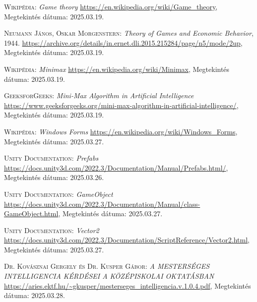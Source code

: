 \documentclass[
]{thesis-ekf}
\theoremstyle{definition}
\theoremstyle{remark}
\begin{document}
\begin{thebibliography}{2}
\textsc{Wikipédia:} \emph{Game theory} 
\url{https://en.wikipedia.org/wiki/Game_theory}, Megtekintés dátuma: 2025.03.19.

\textsc{Neumann János, Oskar Morgenstern}: \emph{Theory of Games and Economic Behavior}, 1944.
\url{https://archive.org/details/in.ernet.dli.2015.215284/page/n5/mode/2up}, Megtekintés dátuma: 2025.03.19.

\textsc{Wikipédia}: \emph{Minimax} 
\url{https://en.wikipedia.org/wiki/Minimax}, Megtekintés dátuma: 2025.03.19.

\textsc{GeeksforGeeks}: \emph{Mini-Max Algorithm in Artificial Intelligence} 
\url{https://www.geeksforgeeks.org/mini-max-algorithm-in-artificial-intelligence/}, Megtekintés dátuma: 2025.03.19.

\textsc{Wikipédia}: \emph{Windows Forms} 
\url{https://en.wikipedia.org/wiki/Windows_Forms}, Megtekintés dátuma: 2025.03.27.

\textsc{Unity Documentation}: \emph{Prefabs} 
\url{https://docs.unity3d.com/2022.3/Documentation/Manual/Prefabs.html/}, Megtekintés dátuma: 2025.03.26.

\textsc{Unity Documentation}: \emph{GameObject} 
\url{https://docs.unity3d.com/2022.3/Documentation/Manual/class-GameObject.html}, Megtekintés dátuma: 2025.03.27.

\textsc{Unity Documentation}: \emph{Vector2} 
\url{https://docs.unity3d.com/2022.3/Documentation/ScriptReference/Vector2.html}, Megtekintés dátuma: 2025.03.27.

\textsc{Dr. Kovásznai Gergely és Dr. Kusper Gábor}: \emph{A MESTERSÉGES INTELLIGENCIA KÉRDÉSEI A KÖZÉPISKOLAI OKTATÁSBAN} 
\url{https://aries.ektf.hu/~gkusper/mesterseges_intelligencia.v.1.0.4.pdf}, Megtekintés dátuma: 2025.03.28.


\end{thebibliography}


\end{document}
